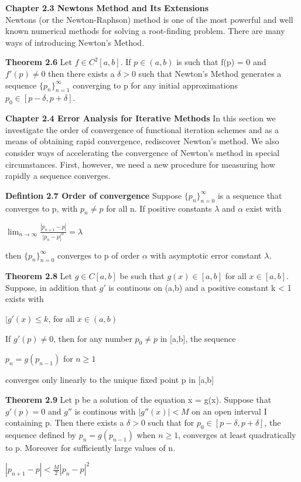 \documentclass{article}
\begin{document}
\textbf {Chapter 2.3 Newtons Method and Its Extensions} 
\\ Newtons (or the Newton-Raphson) method is one of the most powerful and well known numerical methods for solving a root-finding problem. There are many ways of introducing Newton's Method.

\textbf {Theorem 2.6} Let $f \in C^2[a,b].$ If $p \in (a,b)$ is such that f(p) = 0 and $f'(p) \neq 0$ then there exists a $\delta > 0$ such that Newton's Method generates a sequence $\{p_n\}_{n=1}^{\infty}$ converging to p for any initial approximations $p_0 \in [p - \delta, p + \delta]$.

\textbf {Chapter 2.4 Error Analysis for Iterative Methods} In this section we investigate the order of convergence of functional iteration schemes and as a means of obtaining rapid convergence, rediscover Newton's method. We also consider ways of accelerating the convergence of Newton's method in special circumstances. First, however, we need a new procedure for measuring how rapidly a sequence converges.

\textbf {Defintion 2.7 Order of convergence} Suppose $\{p_n\}_{n=0}^{\infty}$ is a sequence that converges to p, with $p_n \neq p$ for all n. If positive constants $\lambda$ and $\alpha$ exist with
\begin{center}
$\displaystyle \lim_{n \to \infty} \frac{|p_{n+1}-p|}{|p_n - p|^{\alpha}} = \lambda$
\end{center}
then $\{p_n\}_{n=0}^{\infty}$ converges to p of order $\alpha$ with asymptotic error constant $\lambda$.

\textbf {Theorem 2.8} Let $g \in C[a,b]$ be such that $g(x) \in [a,b]$ for all $x \in [a,b]$. Suppose, in addition that $g'$ is continous on (a,b) and a positive constant k < 1 exists with
\begin{center}
$|g'(x) \leq k$, for all $x \in (a,b)$
\end{center}
If $g'(p) \neq 0$, then for any number $p_0 \neq p$ in [a,b], the sequence
\begin{center}
$p_n = g(p_{n-1})$ for $n \geq 1$
\end{center}
converges only linearly to the unique fixed point p in [a,b]

\textbf {Theorem 2.9} Let p be a solution of the equation x = g(x). Suppose that $g'(p) = 0$ and $g''$ is continous with $|g''(x)| < M$ on an open interval I containing p. Then there exists a $\delta > 0$ such that for $p_0 \in [p - \delta, p + \delta]$, the sequence defined by $p_n = g(p_{n-1})$ when $n \geq 1$, converges at least quadratically to p. Moreover for sufficiently large values of n.
\begin{center}
$|p_{n+1} - p| < \frac {M}{2} |p_n - p|^2$
\end{center}
\end{document}
